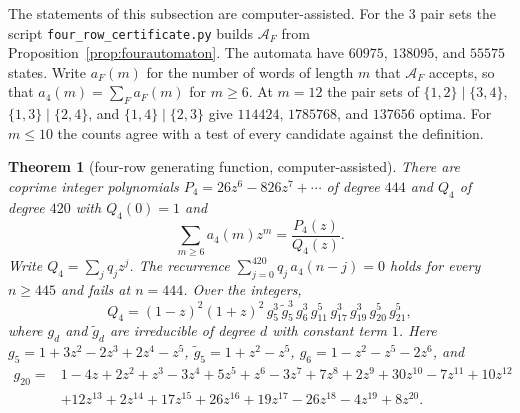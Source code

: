\documentclass[12pt]{article}
\theoremstyle{plain}
\newtheorem{theorem}{Theorem}
\theoremstyle{definition}
\theoremstyle{remark}
\begin{document}
The statements of this subsection are computer-assisted. For the $3$ pair sets
the script \nolinkurl{four_row_certificate.py} builds $\mathcal A_F$ from
Proposition~\ref{prop:fourautomaton}. The automata have
$60975$, $138095$, and $55575$ states. Write $a_F(m)$ for the number of words of
length $m$ that $\mathcal A_F$ accepts, so that $a_4(m)=\sum_Fa_F(m)$ for
$m\ge6$. At $m=12$ the pair sets of $\{1,2\}\mid\{3,4\}$, $\{1,3\}\mid\{2,4\}$,
and $\{1,4\}\mid\{2,3\}$ give $114424$, $1785768$, and $137656$ optima. For
$m\le10$ the counts agree with a test of every candidate against the definition.

\begin{theorem}[four-row generating function, computer-assisted]\label{thm:fourgfexact}
There are coprime integer polynomials $P_4=26z^6-826z^7+\cdots$ of degree $444$
and $Q_4$ of degree $420$ with $Q_4(0)=1$ and
\[
\sum_{m\ge6}a_4(m)z^m=\frac{P_4(z)}{Q_4(z)}.
\]
Write $Q_4=\sum_jq_jz^j$. The recurrence $\sum_{j=0}^{420}q_j\,a_4(n-j)=0$ holds for
every $n\ge445$ and fails at $n=444$. Over the integers,
\[
Q_4=(1-z)^2(1+z)^2\,g_5^3\,\tilde g_5^3\,g_6^3\,g_{11}^5\,g_{17}^3\,g_{19}^3\,g_{20}^5\,g_{21}^5,
\]
where $g_d$ and $\tilde g_d$ are irreducible of degree $d$ with constant term $1$.
Here $g_5=1+3z^2-2z^3+2z^4-z^5$, $\tilde g_5=1+z^2-z^5$,
$g_6=1-z^2-z^5-2z^6$, and
\begin{align*}
g_{20}={}&1-4z+2z^2+z^3-3z^4+5z^5+z^6-3z^7+7z^8+2z^9+30z^{10}-7z^{11}+10z^{12}\\
&+12z^{13}+2z^{14}+17z^{15}+26z^{16}+19z^{17}-26z^{18}-4z^{19}+8z^{20}.
\end{align*}
\end{theorem}
\end{document}
